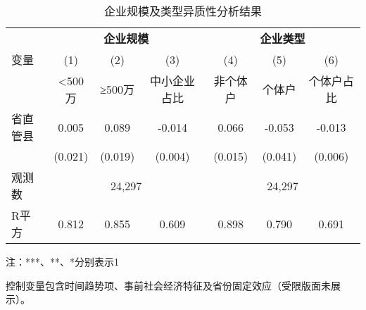 \begin{table}[!htbp]
\footnotesize
\centering
\caption{企业规模及类型异质性分析结果}\label{tab:hetero_firm}
\begin{threeparttable}
\begin{tabular}{l*{6}{c}}
\toprule
 & \multicolumn{3}{c}{\textbf{企业规模}} & \multicolumn{3}{c}{\textbf{企业类型}} \\
\cmidrule(lr){2-4} \cmidrule(l){5-7}
变量 & (1) & (2) & (3) & (4) & (5) & (6) \\
 & <500万 & ≥500万 & 中小企业占比 & 非个体户 & 个体户 & 个体户占比 \\
\midrule
省直管县 & 0.005 & 0.089\tnote{***} & -0.014\tnote{**} & 0.066\tnote{***} & -0.053 & -0.013\tnote{**} \\
 & (0.021) & (0.019) & (0.004) & (0.015) & (0.041) & (0.006) \\
\addlinespace[1ex]
观测数 & \multicolumn{3}{c}{24,297} & \multicolumn{3}{c}{24,297} \\
R平方 & 0.812 & 0.855 & 0.609 & 0.898 & 0.790 & 0.691 \\
\bottomrule
\end{tabular}

\begin{tablenotes}
\scriptsize
\item 注：***、**、*分别表示1%
\item 控制变量包含时间趋势项、事前社会经济特征及省份固定效应（受限版面未展示）。
\end{tablenotes}
\end{threeparttable}
\end{table}
